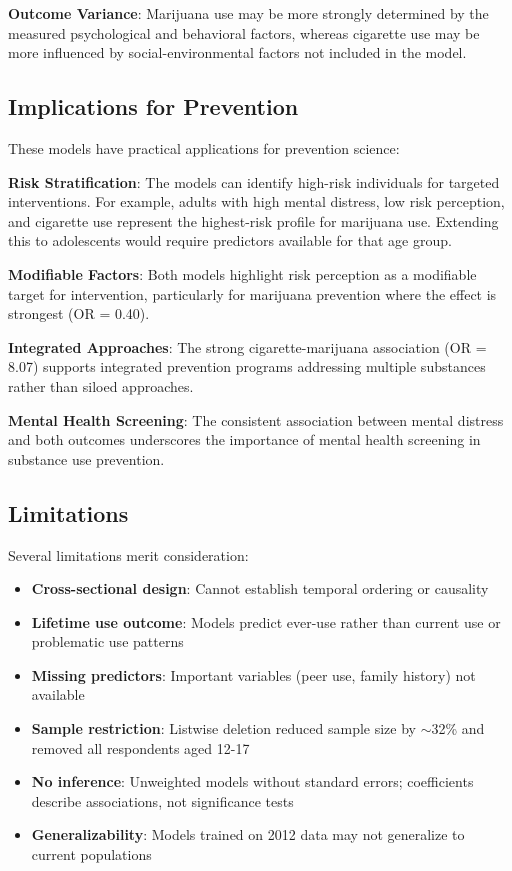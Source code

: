\documentclass[conference]{IEEEtran}
\begin{document}
\textbf{Outcome Variance}: Marijuana use may be more strongly determined by the measured psychological and behavioral factors, whereas cigarette use may be more influenced by social-environmental factors not included in the model.

\subsection{Implications for Prevention}

These models have practical applications for prevention science:

\textbf{Risk Stratification}: The models can identify high-risk individuals for targeted interventions. For example, adults with high mental distress, low risk perception, and cigarette use represent the highest-risk profile for marijuana use. Extending this to adolescents would require predictors available for that age group.

\textbf{Modifiable Factors}: Both models highlight risk perception as a modifiable target for intervention, particularly for marijuana prevention where the effect is strongest (OR = 0.40).

\textbf{Integrated Approaches}: The strong cigarette-marijuana association (OR = 8.07) supports integrated prevention programs addressing multiple substances rather than siloed approaches.

\textbf{Mental Health Screening}: The consistent association between mental distress and both outcomes underscores the importance of mental health screening in substance use prevention.

\subsection{Limitations}

Several limitations merit consideration:

\begin{itemize}
    \item \textbf{Cross-sectional design}: Cannot establish temporal ordering or causality
    \item \textbf{Lifetime use outcome}: Models predict ever-use rather than current use or problematic use patterns
    \item \textbf{Missing predictors}: Important variables (peer use, family history) not available
    \item \textbf{Sample restriction}: Listwise deletion reduced sample size by $\sim$32\% and removed all respondents aged 12-17
    \item \textbf{No inference}: Unweighted models without standard errors; coefficients describe associations, not significance tests
    \item \textbf{Generalizability}: Models trained on 2012 data may not generalize to current populations
\end{itemize}
\end{document}
